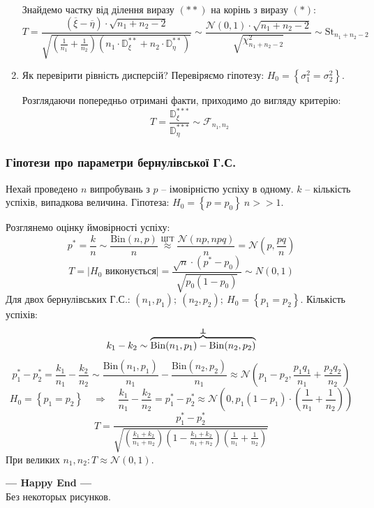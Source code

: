\begin{enumerate}
    \)
  \par
  Знайдемо частку від ділення виразу \( (**) \) на корінь з виразу \( (*) \):
  \[ T =
  \dfrac{\left( \overline{\xi} - \overline{\eta} \right) \cdot \sqrt{n_1 + n_2  -2}}{
   \sqrt{
  \left( \frac{1}{n_1} + \frac{1}{n_2} \right) \left( n_1 \cdot \mathbb{D}^{**}_{\xi} + n_2 \cdot \mathbb{D}^{**}_{\eta}  \right)
  }
    } \sim \frac{\mathcal{N}(0,1)\cdot \sqrt{n_1 + n_2  -2}}{\sqrt{\chi^2_{n_1 + n_2 - 2}}}  \sim \mathrm{St}_{n_1 + n_2 - 2}
  \]
\item Як перевірити рівність дисперсій? Перевіряємо гіпотезу:
\(
 H_0= \left\lbrace \sigma_1^2 = \sigma_2^2 \right\rbrace
\).\par
Розглядаючи попередньо отримані факти, приходимо до вигляду критерію:
\[
 T = \frac{\mathbb{D}^{***}_{\xi}}{\mathbb{D}^{***}_{\eta}} \sim \mathcal{F}_{n_1, n_2}
\]
\end{enumerate}
\subsubsection{Гіпотези про параметри бернулівської Г.С.}
Нехай проведено \( n \) випробувань з \( p \) -- імовірністю успіху в одному. \( k \) -- кількість успіхів, випадкова величина. Гіпотеза: \( H_0 = \left\lbrace p = p_0 \right\rbrace \ n>>1\).\par
Розглянемо оцінку ймовірності успіху:
\[
p^* = \frac{k}{n} \sim \frac{\mathrm{Bin}(n, p)}{n} \overset{\text{ЦГТ}}\approx \frac{\mathcal{N}(np,npq)}{n} = \mathcal{N}\left( p, \frac{pq}{n} \right)
\]
\[
 T =\left| H_0 \text{ виконується} \right| = \frac{\sqrt{n} \cdot (p^* -  p_0)}{\sqrt{p_0(1-p_0)}} \sim N(0,1)
\]
Для двох бернулівських Г.С.: \( (n_1, p_1); \ (n_2, p_2);\ H_0= \left\lbrace p_1 = p_2 \right\rbrace \). Кількість успіхів:
\[
 k_1 - k_2 \sim \overbrace{\mathrm{Bin}(n_1, p_1) - \mathrm{Bin}(n_2, p_2)}^{\independent}
\]
\[
 p_1^* - p_2^* = \frac{k_1}{n_1} - \frac{k_2}{n_2} \sim \frac{\mathrm{Bin}(n_1, p_1)}{n_1}
 - \frac{\mathrm{Bin}(n_2, p_2)}{n_1} \approx \mathcal{N} \left( p_1 - p_2 , \frac{p_1q_1}{n_1} + \frac{p_2q_2}{n_2} \right)
\]
\[
 H_0 = \left\lbrace p_1 = p_2 \right\rbrace \quad \Rightarrow\quad \frac{k_1}{n_1} - \frac{k_2}{n_2}= p^*_1- p_2^* \approx \mathcal{N} \left(
0, p_1 (1-p_1)\cdot \left( \frac{1}{n_1} + \frac{1}{n_2} \right)
  \right)
\]
\[
 T = \frac{p_1^* - p^*_2}{
 \sqrt{
 \left( \frac{k_1 + k_2}{n_1 + n_2} \right) \left( 1 - \frac{k_1 + k_2}{n_1 + n_2} \right)
 \left( \frac{1}{n_1} + \frac{1}{n_2}\right)
 }
 }
\]
При великих \( n_1, n_2: T\approx \mathcal{N}(0,1) \).
\begin{center}
\textbf{	--- Happy End --- }\\
{\tiny Без некоторых рисунков. }
\end{center}
